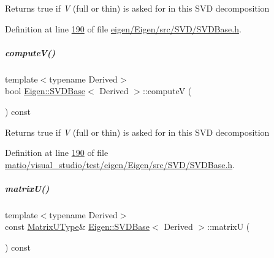 \begin{DoxyReturn}{Returns}
true if {\itshape V} (full or thin) is asked for in this S\+VD decomposition 
\end{DoxyReturn}


Definition at line \hyperlink{eigen_2_eigen_2src_2_s_v_d_2_s_v_d_base_8h_source_l00190}{190} of file \hyperlink{eigen_2_eigen_2src_2_s_v_d_2_s_v_d_base_8h_source}{eigen/\+Eigen/src/\+S\+V\+D/\+S\+V\+D\+Base.\+h}.

\mbox{\label{group___s_v_d___module_a5f12efcb791eb007d4a4890ac5255ac4}} 
\subparagraph{\texorpdfstring{compute\+V()}{computeV()}\hspace{0.1cm}{\footnotesize\ttfamily [2/2]}}
{\footnotesize\ttfamily template$<$typename Derived$>$ \\
bool \hyperlink{group___s_v_d___module_class_eigen_1_1_s_v_d_base}{Eigen\+::\+S\+V\+D\+Base}$<$ Derived $>$\+::computeV (\begin{DoxyParamCaption}{ }\end{DoxyParamCaption}) const\hspace{0.3cm}{\ttfamily [inline]}}

\begin{DoxyReturn}{Returns}
true if {\itshape V} (full or thin) is asked for in this S\+VD decomposition 
\end{DoxyReturn}


Definition at line \hyperlink{matio_2visual__studio_2test_2eigen_2_eigen_2src_2_s_v_d_2_s_v_d_base_8h_source_l00190}{190} of file \hyperlink{matio_2visual__studio_2test_2eigen_2_eigen_2src_2_s_v_d_2_s_v_d_base_8h_source}{matio/visual\+\_\+studio/test/eigen/\+Eigen/src/\+S\+V\+D/\+S\+V\+D\+Base.\+h}.

\mbox{\label{group___s_v_d___module_afc7fe1546b0f6e1801b86f22f5664cb8}} 
\subparagraph{\texorpdfstring{matrix\+U()}{matrixU()}\hspace{0.1cm}{\footnotesize\ttfamily [1/2]}}
{\footnotesize\ttfamily template$<$typename Derived$>$ \\
const \hyperlink{group___core___module}{Matrix\+U\+Type}\& \hyperlink{group___s_v_d___module_class_eigen_1_1_s_v_d_base}{Eigen\+::\+S\+V\+D\+Base}$<$ Derived $>$\+::matrixU (\begin{DoxyParamCaption}{ }\end{DoxyParamCaption}) const\hspace{0.3cm}{\ttfamily [inline]}}

